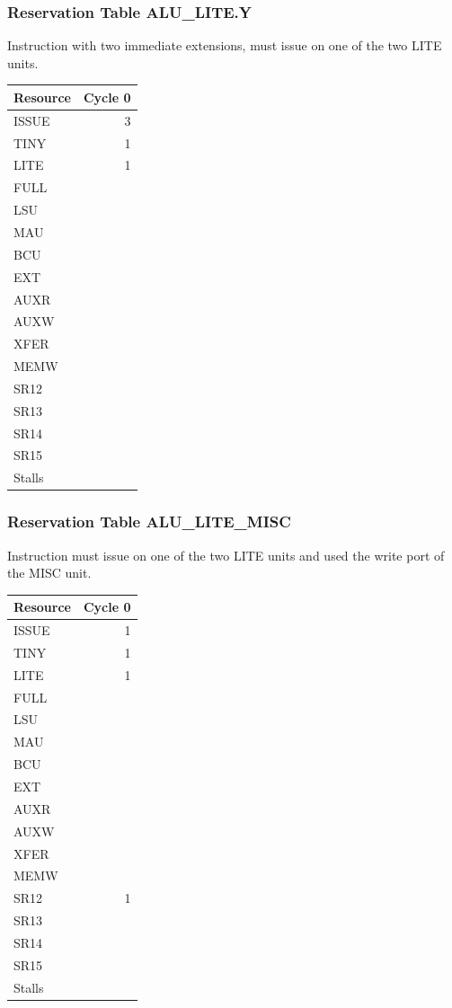 \subsubsection{Reservation Table ALU\_LITE.Y} \label{sec:reservation-ALU-LITE.Y}

Instruction with two immediate extensions, must issue on one of the two LITE units.
\medskip

\begin{tabular}{|l|r|} \hline
Resource	& Cycle 0 \\ \hline
\textsf{ISSUE}	& 3	\\
\textsf{TINY}	& 1	\\
\textsf{LITE}	& 1	\\
\textsf{FULL}	& 	\\
\textsf{LSU}	& 	\\
\textsf{MAU}	& 	\\
\textsf{BCU}	& 	\\
\textsf{EXT}	& 	\\
\textsf{AUXR}	& 	\\
\textsf{AUXW}	& 	\\
\textsf{XFER}	& 	\\
\textsf{MEMW}	& 	\\
\textsf{SR12}	& 	\\
\textsf{SR13}	& 	\\
\textsf{SR14}	& 	\\
\textsf{SR15}	& 	\\
\hline Stalls	& 	\\
\hline \end{tabular}

\subsubsection{Reservation Table ALU\_LITE\_MISC} \label{sec:reservation-ALU-LITE-MISC}

Instruction must issue on one of the two LITE units and used the write port of the MISC unit.
\medskip

\begin{tabular}{|l|r|} \hline
Resource	& Cycle 0 \\ \hline
\textsf{ISSUE}	& 1	\\
\textsf{TINY}	& 1	\\
\textsf{LITE}	& 1	\\
\textsf{FULL}	& 	\\
\textsf{LSU}	& 	\\
\textsf{MAU}	& 	\\
\textsf{BCU}	& 	\\
\textsf{EXT}	& 	\\
\textsf{AUXR}	& 	\\
\textsf{AUXW}	& 	\\
\textsf{XFER}	& 	\\
\textsf{MEMW}	& 	\\
\textsf{SR12}	& 1	\\
\textsf{SR13}	& 	\\
\textsf{SR14}	& 	\\
\textsf{SR15}	& 	\\
\hline Stalls	& 	\\
\hline \end{tabular}

